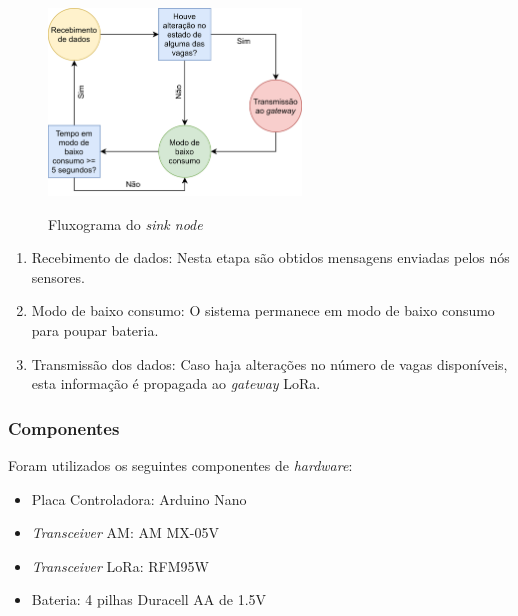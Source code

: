 \documentclass[oneside,openright,12pt]{ufsm_2015} %
\begin{document}
    \begin{figure}[ht]
     	    \caption{\label{exepretex} Fluxograma do \textit{sink node}}
            \centering
            \includegraphics[width=0.6\textwidth]{figuras/sink-node-fluxograma.png}
            \vspace{\baselineskip} %
            \label{fig:flux-sink-node}
    \end{figure}
    
    \begin{enumerate}
        \item
        Recebimento de dados: Nesta etapa são obtidos mensagens enviadas pelos nós sensores.
        \item Modo de baixo consumo: O sistema permanece em modo de baixo consumo para poupar bateria.
        \item Transmissão dos dados: Caso haja alterações no número de vagas disponíveis, esta informação é propagada ao \textit{gateway} LoRa.
    \end{enumerate}
    
    \subsubsection{Componentes}
    Foram utilizados os seguintes componentes de \textit{hardware}:
    \begin{itemize}
        \item Placa Controladora: Arduino Nano
        \item \textit{Transceiver} AM: AM MX-05V
        \item \textit{Transceiver} LoRa: RFM95W
        \item Bateria: 4 pilhas Duracell AA de 1.5V
    \end{itemize}
    
\end{document}
